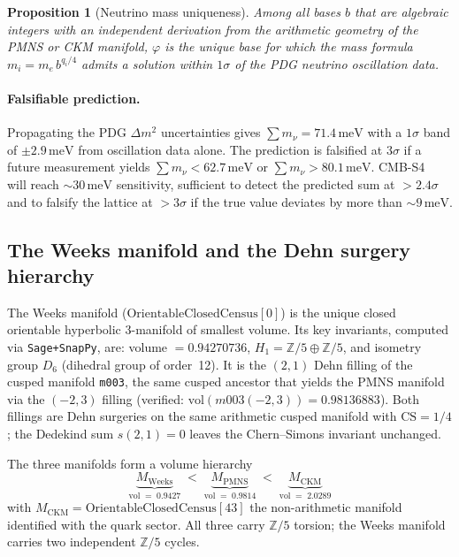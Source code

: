 ﻿\documentclass[12pt]{article}
\newtheorem{proposition}[theorem]{Proposition}
\theoremstyle{definition}
\begin{document}
\begin{proposition}[Neutrino mass uniqueness]
\label{prop:neutrino}
Among all bases $b$ that are algebraic integers with an independent
derivation from the arithmetic geometry of the PMNS or CKM manifold,
$\varphi$ is the unique base for which the mass formula
$m_i = m_e\,b^{q_i/4}$ admits a solution within $1\sigma$ of the
PDG neutrino oscillation data.
\end{proposition}

\paragraph{Falsifiable prediction.}
Propagating the PDG $\Delta m^2$ uncertainties gives
$\sum m_\nu = 71.4\,\text{meV}$ with a $1\sigma$ band of
$\pm 2.9\,\text{meV}$ from oscillation data alone.  The prediction is
falsified at $3\sigma$ if a future measurement yields
$\sum m_\nu < 62.7\,\text{meV}$ or $\sum m_\nu > 80.1\,\text{meV}$.
CMB-S4~\cite{CMBS4} will reach $\sim30\,\text{meV}$ sensitivity,
sufficient to detect the predicted sum at $>2.4\sigma$ and to
falsify the lattice at $>3\sigma$ if the true value deviates
by more than $\sim9\,\text{meV}$.


\subsection{The Weeks manifold and the Dehn surgery hierarchy}
\label{subsec:weeks}

The Weeks manifold ($\mathrm{OrientableClosedCensus}[0]$) is the unique
closed orientable hyperbolic 3-manifold of smallest volume.
Its key invariants, computed via \texttt{Sage+SnapPy}, are:
volume $= 0.94270736$, $H_1 = \mathbb{Z}/5 \oplus \mathbb{Z}/5$,
and isometry group $D_6$ (dihedral group of order~12).
It is the $(2,1)$ Dehn filling of the cusped manifold \texttt{m003},
the same cusped ancestor that yields the PMNS manifold via the $(-2,3)$
filling (verified: $\mathrm{vol}(m003(-2,3)) = 0.98136883$).
Both fillings are Dehn surgeries on the same arithmetic cusped manifold
with $\mathrm{CS} = 1/4$; the Dedekind sum $s(2,1) = 0$ leaves the
Chern--Simons invariant unchanged.

The three manifolds form a volume hierarchy
\[
\underbrace{M_\mathrm{Weeks}}_{\mathrm{vol}\;=\;0.9427}
\;<\;
\underbrace{M_\mathrm{PMNS}}_{\mathrm{vol}\;=\;0.9814}
\;<\;
\underbrace{M_\mathrm{CKM}}_{\mathrm{vol}\;=\;2.0289}
\]
with $M_\mathrm{CKM} = \mathrm{OrientableClosedCensus}[43]$ the
non-arithmetic manifold identified with the quark sector.
All three carry $\mathbb{Z}/5$ torsion; the Weeks manifold carries
two independent $\mathbb{Z}/5$ cycles.
\end{document}
